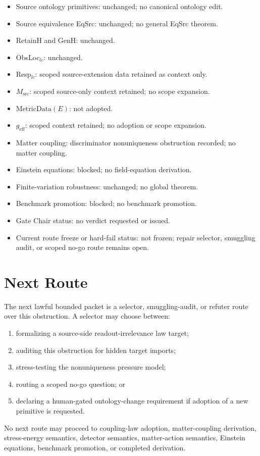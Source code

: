 \begin{itemize}
  \item Source ontology primitives: unchanged; no canonical ontology edit.
  \item Source equivalence EqSrc: unchanged; no general EqSrc theorem.
  \item RetainH and GenH: unchanged.
  \item ObsLoc\(_{lc}\): unchanged.
  \item Resp\(_{lc}\): scoped source-extension data retained as context only.
  \item \(M_{\mathrm{src}}\): scoped source-only context retained; no scope
    expansion.
  \item \(\mathrm{MetricData}(E)\): not adopted.
  \item \(g_{\mathrm{eff}}\): scoped context retained; no adoption or scope
    expansion.
  \item Matter coupling: discriminator nonuniqueness obstruction recorded; no
    matter coupling.
  \item Einstein equations: blocked; no field-equation derivation.
  \item Finite-variation robustness: unchanged; no global theorem.
  \item Benchmark promotion: blocked; no benchmark promotion.
  \item Gate Chair status: no verdict requested or issued.
  \item Current route freeze or hard-fail status: not frozen; repair selector,
    smuggling audit, or scoped no-go route remains open.
\end{itemize}

\section{Next Route}

The next lawful bounded packet is a selector, smuggling-audit, or refuter
route over this obstruction.  A selector may choose between:
\begin{enumerate}
  \item formalizing a source-side readout-irrelevance law target;
  \item auditing this obstruction for hidden target imports;
  \item stress-testing the nonuniqueness pressure model;
  \item routing a scoped no-go question; or
  \item declaring a human-gated ontology-change requirement if adoption of a
    new primitive is requested.
\end{enumerate}
No next route may proceed to coupling-law adoption, matter-coupling
derivation, stress-energy semantics, detector semantics, matter-action
semantics, Einstein equations, benchmark promotion, or completed derivation.

